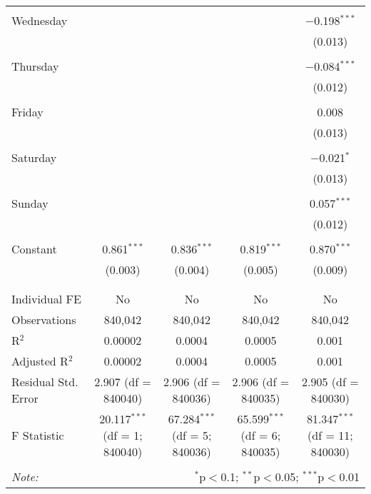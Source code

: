\documentclass[
]{article}
\begin{document}
\begin{table}[!htbp]
{\begin{tabular}{@{\extracolsep{5pt}}lcccc}
  & & & & \\ 
 Wednesday &  &  &  & $-$0.198$^{***}$ \\ 
  &  &  &  & (0.013) \\ 
  & & & & \\ 
 Thursday &  &  &  & $-$0.084$^{***}$ \\ 
  &  &  &  & (0.012) \\ 
  & & & & \\ 
 Friday &  &  &  & 0.008 \\ 
  &  &  &  & (0.013) \\ 
  & & & & \\ 
 Saturday &  &  &  & $-$0.021$^{*}$ \\ 
  &  &  &  & (0.013) \\ 
  & & & & \\ 
 Sunday &  &  &  & 0.057$^{***}$ \\ 
  &  &  &  & (0.012) \\ 
  & & & & \\ 
 Constant & 0.861$^{***}$ & 0.836$^{***}$ & 0.819$^{***}$ & 0.870$^{***}$ \\ 
  & (0.003) & (0.004) & (0.005) & (0.009) \\ 
  & & & & \\ 
\hline \\[-1.8ex] 
Individual FE & No & No & No & No \\ 
Observations & 840,042 & 840,042 & 840,042 & 840,042 \\ 
R$^{2}$ & 0.00002 & 0.0004 & 0.0005 & 0.001 \\ 
Adjusted R$^{2}$ & 0.00002 & 0.0004 & 0.0005 & 0.001 \\ 
Residual Std. Error & 2.907 (df = 840040) & 2.906 (df = 840036) & 2.906 (df = 840035) & 2.905 (df = 840030) \\ 
F Statistic & 20.117$^{***}$ (df = 1; 840040) & 67.284$^{***}$ (df = 5; 840036) & 65.599$^{***}$ (df = 6; 840035) & 81.347$^{***}$ (df = 11; 840030) \\ 
\hline 
\hline \\[-1.8ex] 
\textit{Note:}  & \multicolumn{4}{r}{$^{*}$p$<$0.1; $^{**}$p$<$0.05; $^{***}$p$<$0.01} \\ 
\end{tabular}
} 
\end{table} 
\newpage
\end{document}
